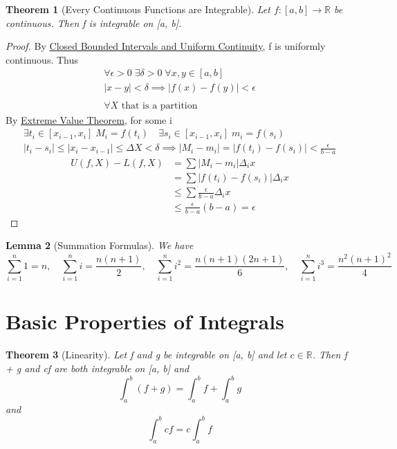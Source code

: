 \documentclass[11pt, oneside]{book}
\theoremstyle{break}
\newtheorem{thm}{Theorem}[section]
\newtheorem*{proof}{Proof}
\newtheorem{lemma}[thm]{Lemma}
\newcommand{\bb}[1]{\mathbb{#1}}			%
\begin{document}
\begin{thm}[Every Continuous Functions are Integrable]
	Let $f: [a, b] \to \bb{R}$ be continuous. Then f is integrable on [a, b].
\end{thm}

\begin{proof}
	By \hyperref[closed_bounded_cts_fn_unif]{Closed Bounded Intervals and Uniform Continuity}, f is uniformly continuous. Thus
	\begin{gather*}
		\forall \epsilon > 0 \; \exists \delta > 0 \; \forall x, y \in [a, b] \\
		|x - y| < \delta \implies |f(x) - f(y)| < \epsilon \\
		\\
		\forall X \text{ that is a partition}
	\end{gather*}
	By \hyperref[EVT]{Extreme Value Theorem}, for some i
	\begin{gather*}
		\exists t_i \in [x_{i - 1} , x_i] \; M_i = f(t_i) \quad \exists s_i \in [x_{i - 1}, x_i] \; m_i = f(s_i) \\
		|t_i - s_i| \leq |x_i - x_{i-1}| \leq \Delta X < \delta \implies |M_i - m_i| = |f(t_i) - f(s_i)| < \frac{\epsilon}{b - a}
	\end{gather*}
	\begin{align*}
		U(f, X) - L(f, X) &= \sum |M_i - m_i| \Delta_i x \\
						  &= \sum |f(t_i) - f(s_i)| \Delta_i x \\
						  &\leq \sum \frac{\epsilon}{b - a} \Delta_i x \\
						  &\leq \frac{\epsilon}{b - a} (b - a) = \epsilon 
	\end{align*}
\end{proof}

\begin{lemma}[Summation Formulas]
	We have
	\[
		\sum_{i=1}^{n} 1 = n, \quad \sum_{i = 1}^{n} i = \frac{n(n+1)}{2}, \quad \sum_{i=1}^{n} i^2 = \frac{n(n+1)(2n+1)}{6}, \quad \sum_{i=1}^{n} i^3 = \frac{n^2 (n+1)^2}{4}
	\]
\end{lemma}


\section{Basic Properties of Integrals}

\begin{thm}[Linearity]
	Let f and g be integrable on [a, b] and let $c \in \bb{R}$. Then f + g and cf are both integrable on [a, b] and
	\[
		\int_{a}^{b} (f+g) = \int_{a}^{b} f + \int_{a}^{b} g
	\]
	and
	\[
		\int_{a}^{b} cf = c \int_{a}^{b} f
	\]
\end{thm}
\end{document}
